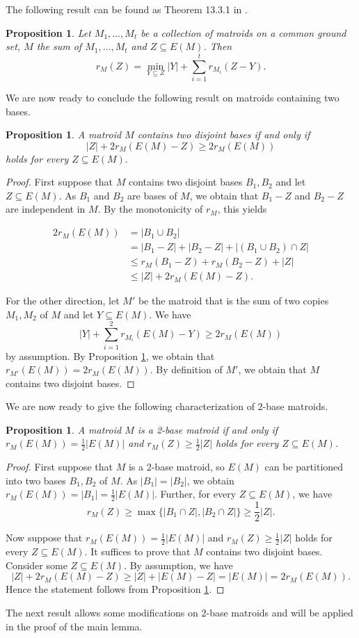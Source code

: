 \documentclass{article}
\newtheorem{Proposition}[Statement]{Proposition}
\begin{document}


The following result can be found as Theorem 13.3.1 in \cite{book}.

\begin{Proposition}\label{sumf}
Let $M_1,\ldots,M_t$ be a collection of matroids on a common ground set, $M$ the sum of $M_1,\ldots,M_t$ and $Z \subseteq E(M)$. Then $$r_M(Z)=\min_{Y \subseteq Z}|Y|+\sum_{i=1}^tr_{M_i}(Z-Y).$$
\end{Proposition}
We are now ready to conclude the following result on matroids containing two bases.

\begin{Proposition}\label{gu1}
A matroid $M$ contains two disjoint bases if and only if $$|Z|+2r_M(E(M)-Z)\geq 2r_M(E(M))$$ holds for every $Z \subseteq E(M).$
\end{Proposition}
\begin{proof}
First suppose that $M$ contains two disjoint bases $B_1,B_2$ and let $Z \subseteq E(M).$ As $B_1$ and $B_2$ are bases of $M$, we obtain that $B_1-Z$ and $B_2-Z$ are independent in $M$.
 By the monotonicity of $r_M$, this yields

 \begin{align*}2r_M(E(M))&=|B_1\cup B_2|\\&=|B_1-Z|+|B_2-Z|+|(B_1\cup B_2)\cap Z|\\ &\leq r_M(B_1-Z)+r_M(B_2-Z)+|Z|\\&\leq |Z|+2r_M(E(M)-Z).\end{align*} 

For the other direction, let $M'$ be the matroid that is the sum of two copies $M_1,M_2$ of $M$ and let $Y \subseteq E(M)$. We have $$|Y|+\sum_{i=1}^2r_{M_i}(E(M)-Y)\geq 2r_M(E(M))$$ by assumption. By Proposition \ref{sumf}, we obtain that $r_{M'}(E(M))=2r_M(E(M))$. By definition of $M'$, we obtain that $M$ contains two disjoint bases.
\end{proof}
We are now ready to give the following characterization of 2-base matroids.
\begin{Proposition}\label{gu2}
A matroid $M$ is a 2-base matroid if and only if $r_M(E(M))=\frac{1}{2}|E(M)|$ and $r_M(Z)\geq \frac{1}{2}|Z|$ holds for every $Z \subseteq E(M)$.
\end{Proposition}
\begin{proof}
First suppose that $M$ is a 2-base matroid, so $E(M)$ can be partitioned into two bases $B_1,B_2$ of $M$. As $|B_1|=|B_2|$, we obtain $r_M(E(M))=|B_1|=\frac{1}{2}|E(M)|$. Further, for every $Z \subseteq E(M)$, we have $$r_M(Z)\geq \max\{|B_1\cap Z|, |B_2 \cap Z|\}\geq \frac{1}{2}|Z|.$$

Now suppose that $r_M(E(M))=\frac{1}{2}|E(M)|$ and $r_M(Z)\geq \frac{1}{2}|Z|$ holds for every $Z \subseteq E(M)$. It suffices to prove that $M$ contains two disjoint bases. Consider some $Z \subseteq E(M)$. By assumption, we have $$|Z|+2r_M(E(M)-Z) \geq |Z|+|E(M)-Z|=|E(M)|=2r_M(E(M)).$$ Hence the statement follows from Proposition \ref{gu1}.
\end{proof}
The next result allows some modifications on 2-base matroids and will be applied in the proof of the main lemma.
\end{document}
